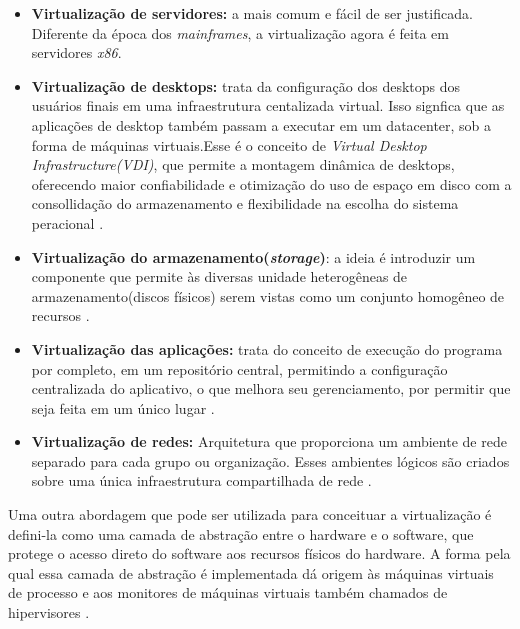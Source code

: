 \begin{itemize}
\item \textbf{Virtualização de servidores:} a mais comum e fácil de ser justificada. Diferente da época dos \textit{mainframes}, a virtualização agora é feita em servidores \textit{x86}.

\item \textbf{Virtualização de desktops:} trata da configuração dos desktops dos usuários finais em uma infraestrutura centalizada virtual. Isso signfica que as aplicações de desktop também passam a executar em um datacenter, sob a forma de máquinas virtuais.Esse é o conceito de \textit{Virtual Desktop Infrastructure(VDI)}, que permite a montagem dinâmica de desktops, oferecendo maior confiabilidade e otimização do uso de espaço em disco com a consollidação do armazenamento e flexibilidade na escolha do sistema peracional \cite{manoel}.

\item \textbf{Virtualização do armazenamento(\textit{storage})}: a ideia é introduzir um componente que permite às diversas unidade heterogêneas de armazenamento(discos físicos) serem vistas como um conjunto homogêneo de recursos \cite{manoel}.

\item \textbf{Virtualização das aplicações:} trata do conceito de execução do programa por completo, em um repositório central, permitindo a configuração centralizada do aplicativo, o que melhora seu gerenciamento, por permitir que seja feita em um único lugar \cite{manoel}. 

\item \textbf{Virtualização de redes: } Arquitetura que proporciona um ambiente de rede separado para cada grupo ou organização. Esses ambientes lógicos são criados sobre uma única infraestrutura compartilhada de rede \cite{manoel}.

\end{itemize}

Uma outra abordagem que pode ser utilizada para conceituar a virtualização é defini-la como uma camada de abstração entre o hardware e o software, que protege o acesso direto do software aos recursos físicos do hardware. A forma pela qual essa camada de abstração é implementada dá origem às máquinas virtuais de processo e aos monitores de máquinas virtuais também chamados de hipervisores \cite{manoel}.

